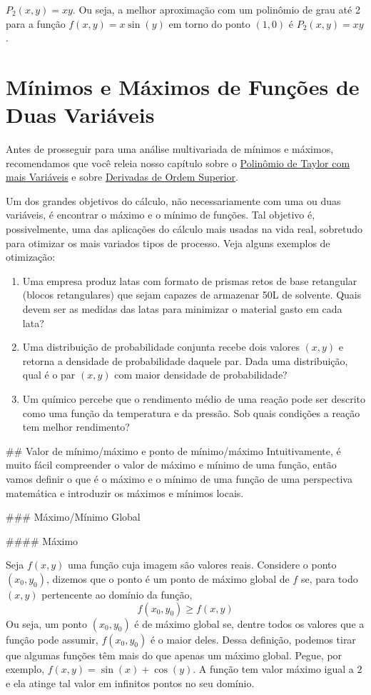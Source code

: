 \documentclass[
  letterpaper,
  DIV=11,
  numbers=noendperiod]{scrreprt}
\providecommand{\tightlist}{%
  \setlength{\itemsep}{0pt}\setlength{\parskip}{0pt}}\usepackage{longtable,booktabs,array}
\begin{document}
\(P_2(x,y) = xy\). Ou seja, a melhor aproximação com um polinômio de
grau até 2 para a função \(f(x,y)=x \sin(y)\) em torno do ponto
\((1,0)\) é \(P_2(x,y)=xy\).

\chapter{Mínimos e Máximos de Funções de Duas
Variáveis}\label{muxednimos-e-muxe1ximos-de-funuxe7uxf5es-de-duas-variuxe1veis}

Antes de prosseguir para uma análise multivariada de mínimos e máximos,
recomendamos que você releia nosso capítulo sobre o
\href{taylor-multi.qmd}{Polinômio de Taylor com mais Variáveis} e sobre
\href{d-ordem-superior.qmd}{Derivadas de Ordem Superior}.

Um dos grandes objetivos do cálculo, não necessariamente com uma ou duas
variáveis, é encontrar o máximo e o mínimo de funções. Tal objetivo é,
possivelmente, uma das aplicações do cálculo mais usadas na vida real,
sobretudo para otimizar os mais variados tipos de processo. Veja alguns
exemplos de otimização:

\begin{enumerate}
\def\labelenumi{\arabic{enumi}.}
\tightlist
\item
  Uma empresa produz latas com formato de prismas retos de base
  retangular (blocos retangulares) que sejam capazes de armazenar 50L de
  solvente. Quais devem ser as medidas das latas para minimizar o
  material gasto em cada lata?
\item
  Uma distribuição de probabilidade conjunta recebe dois valores
  \((x,y)\) e retorna a densidade de probabilidade daquele par. Dada uma
  distribuição, qual é o par \((x,y)\) com maior densidade de
  probabilidade?
\item
  Um químico percebe que o rendimento médio de uma reação pode ser
  descrito como uma função da temperatura e da pressão. Sob quais
  condições a reação tem melhor rendimento?
\end{enumerate}

\#\# Valor de mínimo/máximo e ponto de mínimo/máximo Intuitivamente, é
muito fácil compreender o valor de máximo e mínimo de uma função, então
vamos definir o que é o máximo e o mínimo de uma função de uma
perspectiva matemática e introduzir os máximos e mínimos locais.

\#\#\# Máximo/Mínimo Global

\#\#\#\# Máximo

Seja \(f(x,y)\) uma função cuja imagem são valores reais. Considere o
ponto \((x_0, y_0)\), dizemos que o ponto é um ponto de máximo global de
\(f\) se, para todo \((x,y)\) pertencente ao domínio da função, \[
  f(x_0, y_0) \geq f(x,y)
  \] Ou seja, um ponto \((x_0, y_0)\) é de máximo global se, dentre
todos os valores que a função pode assumir, \(f(x_0, y_0)\) é o maior
deles. Dessa definição, podemos tirar que algumas funções têm mais do
que apenas um máximo global. Pegue, por exemplo,
\(f(x,y)= \sin(x) + \cos(y)\). A função tem valor máximo igual a \(2\) e
ela atinge tal valor em infinitos pontos no seu domínio.
\end{document}

